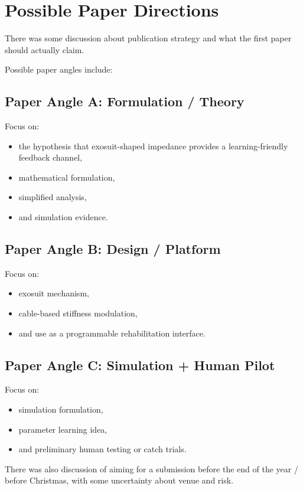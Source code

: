 \documentclass[11pt]{article}
\begin{document}
\section{Possible Paper Directions}
There was some discussion about publication strategy and what the first paper should actually claim.

Possible paper angles include:

\subsection{Paper Angle A: Formulation / Theory}
Focus on:
\begin{itemize}[leftmargin=1.5em]
    \item the hypothesis that exosuit-shaped impedance provides a learning-friendly feedback channel,
    \item mathematical formulation,
    \item simplified analysis,
    \item and simulation evidence.
\end{itemize}

\subsection{Paper Angle B: Design / Platform}
Focus on:
\begin{itemize}[leftmargin=1.5em]
    \item exosuit mechanism,
    \item cable-based stiffness modulation,
    \item and use as a programmable rehabilitation interface.
\end{itemize}

\subsection{Paper Angle C: Simulation + Human Pilot}
Focus on:
\begin{itemize}[leftmargin=1.5em]
    \item simulation formulation,
    \item parameter learning idea,
    \item and preliminary human testing or catch trials.
\end{itemize}

There was also discussion of aiming for a submission before the end of the year / before Christmas, with some uncertainty about venue and risk.
\end{document}
